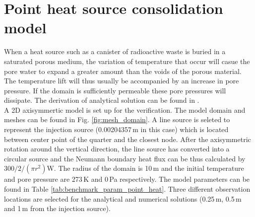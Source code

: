 \documentclass[a4paper,10pt]{article}
\begin{document}
\section*{Point heat source consolidation model}
When a heat source such as a canister of radioactive waste is buried in a saturated porous medium, the variation of temperature that occur will casue the pore water to expand a greater amount than the voids of the porous material. The
temperature lift will thus usually be accompanied by an increase in pore pressure. If the domain is sufficiently
permeable these pore pressures will dissipate. The derivation of analytical solution can be found in \cite{kolditz2016thermo}. \\
A 2D axisymmertic model is set up for the verification. The model domain and meshes can be found in Fig. \ref{fig:mesh_domain}. A line source is seleted to represent the injection source (0.00204357\,m in this case) which is located between center point of the quarter and the closest node. After the axisymmetric rotation around the vertical direction, the line source has converted into a circular source and the Neumann boundary heat flux can be thus calculated by $300/2/(\pi r^2)$W. The radius of the domain is 10\,m and the initial temperature and pore pressure are 273\,K and 0\,Pa respectively. The model parameters can be found in Table \ref{tab:benchmark_param_point_heat}. Three different observation locations are selected for the analytical and numerical solutions (0.25\,m, 0.5\,m and 1\,m from the injection source).
\end{document}

